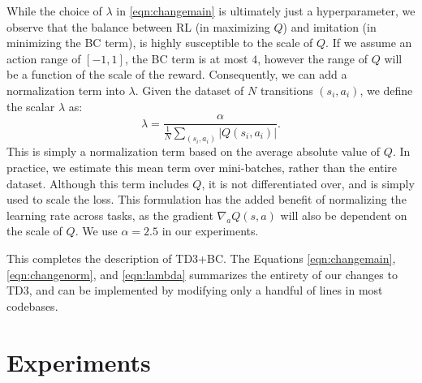 \documentclass{article}
\newcommand{\al}{\alpha}
\begin{document}
While the choice of $\lambda$ in \autoref{eqn:changemain} is ultimately just a hyperparameter, we observe that the balance between RL (in maximizing $Q$) and imitation (in minimizing the BC term), is highly susceptible to the scale of $Q$. If we assume an action range of $[-1,1]$, the BC term is at most $4$, however the range of $Q$ will be a function of the scale of the reward. Consequently, we can add a normalization term into $\lambda$. Given the dataset of $N$ transitions $(s_i,a_i)$, we define the scalar $\lambda$ as:
\begin{equation} \label{eqn:lambda}
    \lambda = \frac{\al}{\frac{1}{N} \sum_{(s_i,a_i)} |Q(s_i,a_i)|}.
\end{equation}
This is simply a normalization term based on the average absolute value of $Q$. In practice, we estimate this mean term over mini-batches, rather than the entire dataset. Although this term includes $Q$, it is not differentiated over, and is simply used to scale the loss. This formulation has the added benefit of normalizing the learning rate across tasks, as the gradient $\nabla_a Q(s,a)$ will also be dependent on the scale of $Q$. We use $\al=2.5$ in our experiments. 

This completes the description of TD3+BC. The Equations \ref{eqn:changemain}, \ref{eqn:changenorm}, and \ref{eqn:lambda} summarizes the entirety of our changes to TD3, and can be implemented by modifying only a handful of lines in most codebases. 



\section{Experiments} \label{sec:experiments}
\end{document}
